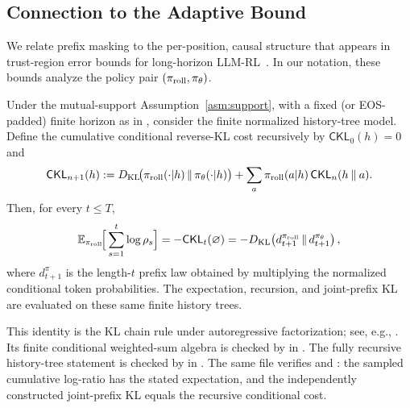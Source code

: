 \subsection{Connection to the Adaptive Bound}
\label{sec:adaptive-connection}

We relate prefix masking to the per-position, causal structure that appears in trust-region error bounds for long-horizon
LLM-RL~\citep{li2025trm}. In our notation, these bounds analyze the policy pair $(\pi_{\mathrm{roll}},\pi_{\theta})$.

\begin{remark}
\label{rem:cumsum-kl}
Under the mutual-support Assumption~\ref{asm:support}, with a fixed (or EOS-padded) finite horizon as in
, consider the finite normalized history-tree model. Define the cumulative conditional reverse-KL cost
recursively by $\mathsf{CKL}_0(h)=0$ and
\begin{equation}
    \mathsf{CKL}_{n+1}(h)
    := D_{\mathrm{KL}}\!\big(\pi_{\mathrm{roll}}(\cdot|h)\,\|\,\pi_{\theta}(\cdot|h)\big)
       + \sum_a \pi_{\mathrm{roll}}(a|h)\,\mathsf{CKL}_{n}(h\mathbin{\|}a).
    \label{eq:cumulative-conditional-kl-recursion}
\end{equation}
Then, for every $t\le T$,
\begin{equation}
    \mathbb{E}_{\pi_{\mathrm{roll}}}\!\Big[\sum_{s=1}^{t} \log\rho_s\Big]
    = -\mathsf{CKL}_{t}(\varnothing)
    = -D_{\mathrm{KL}}\!\left(d_{t+1}^{\pi_{\mathrm{roll}}}\,\|\,d_{t+1}^{\pi_{\theta}}\right),
    \label{eq:cumsum-kl}
\end{equation}
where $d_{t+1}^{\pi}$ is the length-$t$ prefix law obtained by multiplying the normalized conditional token probabilities.
The expectation, recursion, and joint-prefix KL are evaluated on these same finite history trees.
\par
\noindent This identity is the KL chain rule under autoregressive factorization; see, e.g., \citet{li2025trm}.
Its finite conditional weighted-sum algebra is checked by
 in
.
The fully recursive history-tree statement is checked by
 in
.
The same file verifies  and
: the sampled cumulative log-ratio has the
stated expectation, and the independently constructed joint-prefix KL equals
the recursive conditional cost.
\end{remark}

